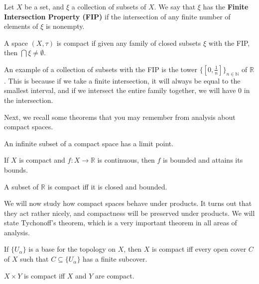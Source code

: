 	\begin{definition}
		Let $X$ be a set, and $\xi$ a collection of subsets of $X$. We say that $\xi$ has the \textbf{Finite Intersection 
		Property (FIP)} if the intersection of any finite number of elements of $\xi$ is nonempty.
	\end{definition}
	
	\begin{theorem}
		A space $(X, \tau)$ is compact if given any family of closed subsets $\xi$ with the FIP, then $\bigcap\xi\neq
		\emptyset$.
	\end{theorem}
	
	An example of a collection of subsets with the FIP is the tower $\{[0, \frac{1}{n}]\}_{n\in\mathbb N}$ of $\mathbb R$. This is because if we take a finite intersection, it will always be equal to the smallest interval, and if we intersect the entire family together, we will have $0$ in the intersection. 
		
	Next, we recall some theorems that you may remember from analysis about compact spaces.
	
	\begin{theorem}
		An infinite subset of a compact space has a limit point.
	\end{theorem}
	
	\begin{theorem}
		If $X$ is compact and $f : X\rightarrow\mathbb R$ is continuous, then $f$ is bounded and attains its bounds.
	\end{theorem}
	
	\begin{theorem}
		A subset of $\mathbb R$ is compact iff it is closed and bounded.
	\end{theorem}
	
	We will now study how compact spaces behave under products. It turns out that they act rather nicely, and compactness will be preserved under products. We will state Tychonoff's theorem, which is a very important theorem in all areas of analysis.
	
	\begin{lemma}
		If $\{U_\alpha\}$ is a base for the topology on $X$, then $X$ is compact iff every open cover $C$ of $X$ such that 
		$C\subseteq\{U_\alpha\}$ has a 
		finite subcover.
	\end{lemma}
	
	\begin{prop}
		$X\times Y$ is compact iff $X$ and $Y$ are compact.
	\end{prop}
	
